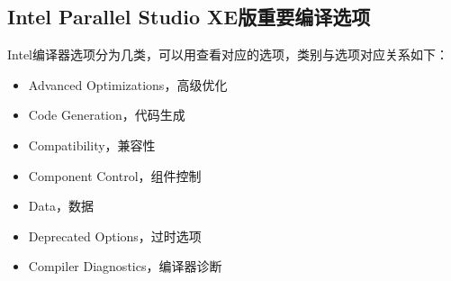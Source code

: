 \documentclass[a4paper,12pt,english]{sphinxmanual}
\begin{document}
\subsection{Intel Parallel Studio XE版重要编译选项}
\label{\detokenize{compiler/intel:intel-parallel-studio-xe}}
\sphinxAtStartPar
Intel编译器选项分为几类，可以用查看对应的选项，类别与选项对应关系如下：
\begin{description}
\begin{itemize}
\item {} 
\sphinxAtStartPar
Advanced Optimizations，高级优化

\end{itemize}

\begin{itemize}
\item {} 
\sphinxAtStartPar
Code Generation，代码生成

\end{itemize}

\begin{itemize}
\item {} 
\sphinxAtStartPar
Compatibility，兼容性

\end{itemize}

\begin{itemize}
\item {} 
\sphinxAtStartPar
Component Control，组件控制

\end{itemize}

\begin{itemize}
\item {} 
\sphinxAtStartPar
Data，数据

\end{itemize}

\begin{itemize}
\item {} 
\sphinxAtStartPar
Deprecated Options，过时选项

\end{itemize}

\begin{itemize}
\item {} 
\sphinxAtStartPar
Compiler Diagnostics，编译器诊断

\end{itemize}


\end{description}
\end{document}
